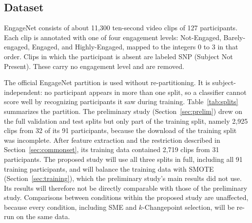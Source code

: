 \subsection{Dataset}

EngageNet \cite{singh2023} consists of about 11,300 ten-second video clips of 127 participants. Each clip is annotated with one of four engagement levels: Not-Engaged, Barely-engaged, Engaged, and Highly-Engaged, mapped to the integers 0 to 3 in that order. Clips in which the participant is absent are labeled SNP (Subject Not Present). These carry no engagement level and are removed.

The official EngageNet partition is used without re-partitioning. It is subject-independent: no participant appears in more than one split, so a classifier cannot score well by recognizing participants it saw during training. Table~\ref{tab:splits} summarizes the partition. The preliminary study (Section~\ref{sec:prelim}) drew on the full validation and test splits but only part of the training split, namely 2,925 clips from 32 of its 91 participants, because the download of the training split was incomplete. After feature extraction and the restriction described in Section~\ref{sec:commonset}, its training data contained 2,719 clips from 31 participants. The proposed study will use all three splits in full, including all 91 training participants, and will balance the training data with SMOTE (Section~\ref{sec:training}), which the preliminary study's main results did not use. Its results will therefore not be directly comparable with those of the preliminary study. Comparisons between conditions within the proposed study are unaffected, because every condition, including SME and $k$-Changepoint selection, will be re-run on the same data.

